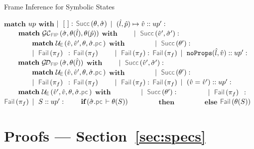 {\begin{algorithm}[h!]
\caption{Frame Inference for Symbolic States}\label{fip:symb:states:up}
\begin{algorithmic}[1]
    \State $\textbf{match}$ $up$ $\textbf{with}$
    \State $\mid~[ \ ]:$ \Return $\success{\subst, \sstate}$
    \State $\mid~(\hat{l}, \hat{p}) \mapsto \hat{v} :: up' :$ 
    \State $\qquad \textbf{match} \ \GetCellV{\sstate, \subst(\sloc), \subst(\sexprp)}$ $\textbf{with}$
    \State $\qquad \mid~\success{\sexprv', \sstate'}:$
    \State $\qquad \qquad \textbf{match} \ \unifylexpr(\sexprv, \sexprv', \subst, \sstate.\pcsel)$ $\textbf{with}$
     \State $\qquad \qquad \mid~ \success{\subst'}:$ \Return {}
      \State $\qquad \qquad \mid~ \fail{\pc_f} \ \, :$ \Return $\fail{\pc_f}$
      \State $\qquad \mid~\fail{\pc_f}:$ \Return $\fail{\pc_f}$
     \State $\mid~\texttt{noProps}(\hat{l}, \hat{v}) :: up' :$  
       \State $\qquad \textbf{match} \ \GetDomainV{\sstate, \subst(\sloc)}$ $\textbf{with}$
       \State $\qquad \mid~\success{\sexprv', \sstate'}:$
         \State $\qquad \qquad \textbf{match} \ \unifylexpr(\sexprv, \sexprv', \subst, \sstate.\pcsel)$ $\textbf{with}$
       \State $\qquad \qquad \mid~ \success{\subst'}:$ \Return {}
       \State $\qquad \qquad \mid~ \fail{\pc_f} \ \, :$ \Return $\fail{\pc_f}$
       \State $\qquad \mid~\fail{\pc_f}:$ \Return $\fail{\pc_f}$
     \State $\mid~(\hat{v} = \hat{v}') :: up' :$  
        \State $\qquad \textbf{match} \ \unifylexpr(\sexprv', \sexprv, \subst, \sstate.\pcsel)$ $\textbf{with}$
         \State $\qquad \qquad \mid~ \success{\subst'}:$ \Return {}
       \State $\qquad \qquad \mid~ \fail{\pc_f} \ \, :$ \Return $\fail{\pc_f}$
     \State $\mid~S :: up' :$   
      \State $\qquad \textbf{if} \,(\sstate.\pcsel \vdash \subst(\sass))$
       \State $\qquad \qquad \textbf{then}$ \Return  {}
      \State $\qquad \qquad \textbf{else}$  \Return $\fail{\subst(\sass)}$
\EndFunction
\end{algorithmic}
\end{algorithm}}


\newpage
\section{Proofs --- Section~\ref{sec:specs}}

